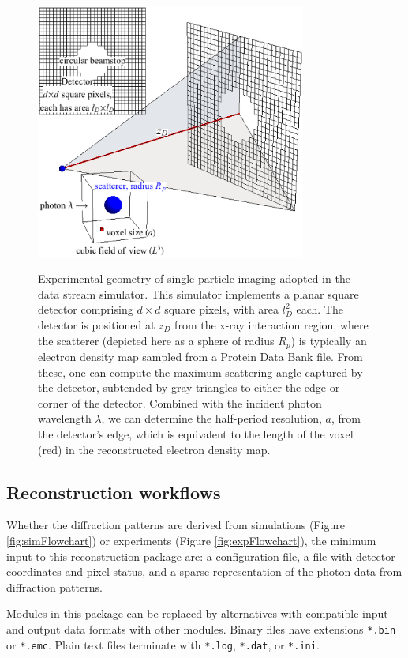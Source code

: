 \documentclass[preprint]{iucr}              %
\begin{document}
\begin{figure}
\caption{Experimental geometry of single-particle imaging adopted in the data stream simulator. This simulator implements a planar square detector comprising $d\times d$ square pixels, with area $l_D^2$ each. The detector is positioned at $z_D$ from the x-ray interaction region, where the scatterer (depicted here as a sphere of radius $R_p$) is typically an electron density map sampled from a Protein Data Bank file. From these, one can compute the maximum scattering angle captured by the detector, subtended by gray triangles to either the edge or corner of the detector. Combined with the incident photon wavelength $\lambda$,  we can determine the half-period resolution, $a$, from the detector's edge, which is equivalent to the length of the voxel (red) in the reconstructed electron density map.}
\includegraphics[width=3.5in]{figures/geometry.eps} \label{fig:expGeometry}
\end{figure}

\subsection{Reconstruction workflows}\label{sec:dataStreamSim}

Whether the diffraction patterns are derived from simulations (Figure \ref{fig:simFlowchart}) or experiments (Figure \ref{fig:expFlowchart}), the minimum input to this reconstruction package are: a configuration file, a file with detector coordinates and pixel status, and a sparse representation of the photon data from diffraction patterns. 

Modules in this package can be replaced by alternatives with compatible input and output data formats with other modules. Binary files have extensions \texttt{*.bin} or \texttt{*.emc}. Plain text files terminate with \texttt{*.log}, \texttt{*.dat}, or \texttt{*.ini}.
\end{document}
